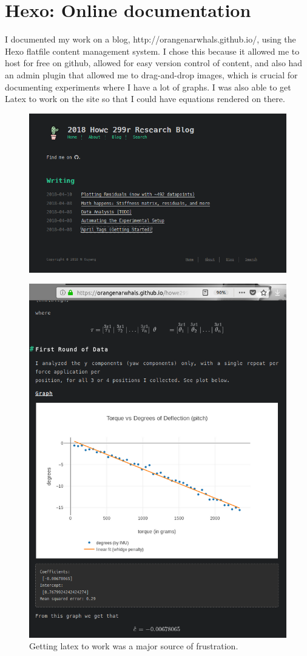 \documentclass[preprint,12pt,3p]{elsarticle}
\begin{document}
\section{Hexo: Online documentation}

I documented my work on a blog, http://orangenarwhals.github.io/, using the Hexo flatfile content
management system. I chose this because it allowed me to host for free on github, allowed for easy
version control of content, and also had an admin plugin that allowed me to drag-and-drop images,
which is crucial for documenting experiments where I have a lot of graphs. I was also able to get
Latex to work on the site so that I could have equations rendered on there.

\begin{figure}[H]
\centering
\includegraphics[width=.8\textwidth]{images/misc/blog.png}
\end{figure}


\begin{figure}[H]
\centering
\includegraphics[width=.8\textwidth]{images/misc/blog_latex.png}
\caption{Getting latex to work was a major source of frustration.}
\end{figure}
\end{document}
